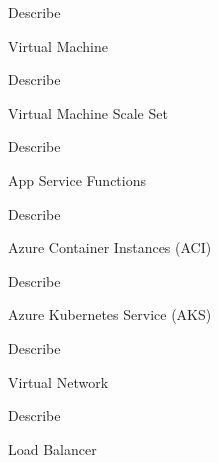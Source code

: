 \documentclass{scrartcl}
\newenvironment{flashcard}[2][]{%
    #1
    \vfill
    \centerline{\Large{#2}}
    \vfill
    \newpage
}
{\newpage}
\begin{document}
    \begin{flashcard}[Describe]{Virtual Machine}

    \end{flashcard}

    \begin{flashcard}[Describe]{Virtual Machine Scale Set}

    \end{flashcard}

    \begin{flashcard}[Describe]{App Service Functions}

    \end{flashcard}

    \begin{flashcard}[Describe]{Azure Container Instances (ACI)}

    \end{flashcard}

    \begin{flashcard}[Describe]{Azure Kubernetes Service (AKS)}

    \end{flashcard}

    \begin{flashcard}[Describe]{Virtual Network}

    \end{flashcard}

    \begin{flashcard}[Describe]{Load Balancer}

    \end{flashcard}
\end{document}
